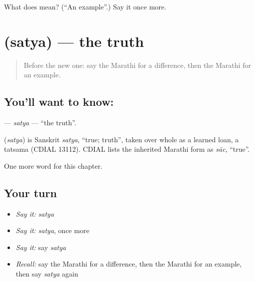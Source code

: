 \begin{tcolorbox}[breakable,colback=teal!4,colframe=teal!35!black,title={Before you move on}]
What does  mean? (\textquotedblleft{}An example\textquotedblright{}.) Say it once more.
\end{tcolorbox}
\section[\texorpdfstring{\mr{सत्य} (satya)}{सत्य (satya)}]{ (satya) — the truth}

\label{lesson:MR-C239-satya}



\begin{quote}
Before the new one: say the Marathi for a difference, then the Marathi for an example.
\end{quote}

\subsection*{You'll want to know: }
\textbf{} — \emph{satya} — \textquotedblleft{}the truth\textquotedblright{}.

\begin{cousinweb}
\textbf{} (\emph{satya}) is Sanskrit \emph{satya}, \textquotedblleft{}true; truth\textquotedblright{}, taken over whole as a learned loan, a tatsama (CDIAL 13112). CDIAL lists the inherited Marathi form as \emph{sāc}, \textquotedblleft{}true\textquotedblright{}.
\end{cousinweb}

\begin{grammarlens}[title={What you've built}]
One more word for this chapter.
\end{grammarlens}

\subsection*{Your turn}
\begin{itemize}
\raggedright
  \item \emph{Say it:} \emph{satya}
  \item \emph{Say it:} \emph{satya}, once more
  \item \emph{Say it:} say \emph{satya}
  \item \emph{Recall:} say the Marathi for a difference, then the Marathi for an example, then say \emph{satya} again
\end{itemize}

